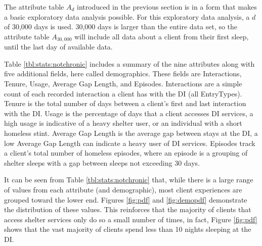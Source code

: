 The attribute table $A_d$ introduced in the previous section is in a form that makes a basic exploratory data analysis possible. For this exploratory data analysis, a $d$ of 30,000 days is used. 30,000 days is larger than the entire data set, so the attribute table $A_{30,000}$ will include all data about a client from their first sleep, until the last day of available data.

Table \ref{tbl:stats:notchronic} includes a summary of the nine attributes along with five additional fields, here called demographics. These fields are Interactions, Tenure, Usage, Average Gap Length, and Episodes. Interactions are a simple count of each recorded interaction a client has with the DI (all EntryTypes). Tenure is the total number of days between a client's first and last interaction with the DI. Usage is the percentage of days that a client accesses DI services, a high usage is indicative of a heavy shelter user, or an individual with a short homeless stint. Average Gap Length is the average gap between stays at the DI, a low Average Gap Length can indicate a heavy user of DI services. Episodes track a client's total number of homeless episodes, where an episode is a grouping of shelter sleeps with a gap between sleeps not exceeding 30 days.

It can be seen from Table \ref{tbl:stats:notchronic} that, while there is a large range of values from each attribute (and demographic), most client experiences are grouped toward the lower end. Figures \ref{fig:pdf} and \ref{fig:demopdf} demonstrate the distribution of these values. This reinforces that the majority of clients that access shelter services only do so a small number of times, in fact, Figure \ref{fig:pdf} shows that the vast majority of clients spend less than 10 nights sleeping at the DI.


